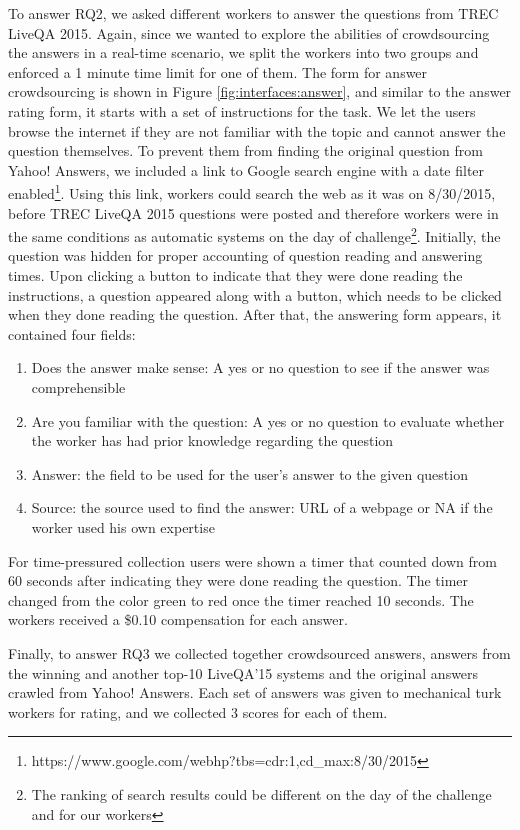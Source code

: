 \documentclass[11pt,letterpaper]{article}
\begin{document}
To answer RQ2, we asked different workers to answer the questions from TREC LiveQA 2015.
Again, since we wanted to explore the abilities of crowdsourcing the answers in a real-time scenario, we split the workers into two groups and enforced a 1 minute time limit for one of them.
The form for answer crowdsourcing is shown in Figure \ref{fig:interfaces:answer}, and similar to the answer rating form, it starts with a set of instructions for the task.
We let the users browse the internet if they are not familiar with the topic and cannot answer the question themselves.
To prevent them from finding the original question from Yahoo! Answers, we included a link to Google search engine with a date filter enabled\footnote{https://www.google.com/webhp?tbs=cdr:1,cd\_max:8/30/2015}.
Using this link, workers could search the web as it was on 8/30/2015, before TREC LiveQA 2015 questions were posted and therefore workers were in the same conditions as automatic systems on the day of challenge\footnote{The ranking of search results could be different on the day of the challenge and for our workers}.
Initially, the question was hidden for proper accounting of question reading and answering times.
Upon clicking a button to indicate that they were done reading the instructions, a question appeared along with a button, which needs to be clicked when they done reading the question.
After that, the answering form appears, it contained four fields:
\begin{enumerate}
\item Does the answer make sense: A yes or no question to see if the answer was comprehensible 
\item Are you familiar with the question: A yes or no question to evaluate whether the worker has had prior knowledge regarding the question
\item Answer: the field to be used for the user's answer to the given question
\item Source: the source used to find the answer: URL of a webpage or NA if the worker used his own expertise
\end{enumerate}

For time-pressured collection users were shown a timer that counted down from 60 seconds after indicating they were done reading the question.
The timer changed from the color green to red once the timer reached 10 seconds.
The workers received a \$0.10 compensation for each answer.

Finally, to answer RQ3 we collected together crowdsourced answers, answers from the winning and another top-10 LiveQA'15 systems and the original answers crawled from Yahoo! Answers.
Each set of answers was given to mechanical turk workers for rating, and we collected 3 scores for each of them.
\end{document}
